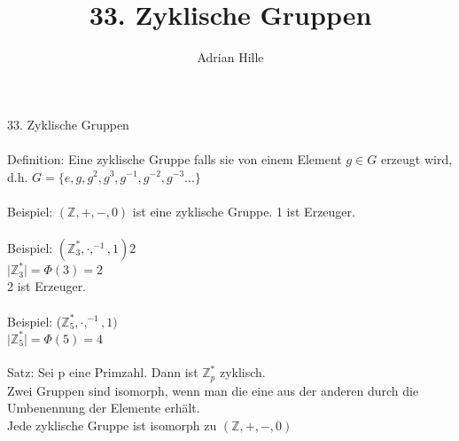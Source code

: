 \documentclass{scrartcl}
\title{33. Zyklische Gruppen}
\author{Adrian Hille}
\begin{document}
\Large 33. Zyklische Gruppen\\
\\
\normalsize
Definition: Eine zyklische Gruppe falls sie von einem Element $g \in G$ erzeugt wird, d.h. $G= \{e, g, g^2, g^3, g^{-1}, g^{-2}, g^{-3}... \}$\\
\\
Beispiel: $(\mathbb{Z}, +, -, 0)$ ist eine zyklische Gruppe. 1 ist Erzeuger.\\
\\
Beispiel: $(\mathbb{Z}_3^*, \cdot, ^{-1}, 1) 2$\\
$\vert \mathbb{Z}_3^* \vert = \Phi (3) = 2 $\\
2 ist Erzeuger.\\
\\
Beispiel: ($\mathbb{Z}_5^*, \cdot, ^{-1}, 1)$\\
$\vert \mathbb{Z}_5^* \vert = \Phi (5) = 4$\\
\\
Satz: Sei p eine Primzahl. Dann ist $\mathbb{Z}_p^*$ zyklisch.\\
Zwei Gruppen sind isomorph, wenn man die eine aus der anderen durch die Umbenennung der Elemente erh\"alt.\\
Jede zyklische Gruppe ist isomorph zu $( \mathbb{Z}, +, -, 0)$\\
\\
\end{document}
